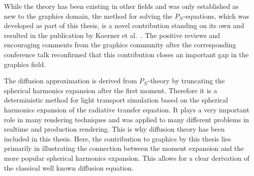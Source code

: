 While the theory has been existing in other fields and was only established as new to the graphics domain, the method for solving the $P_N$-equations, which was developed as part of this thesis, is a novel contribution standing on its own and resulted in the publication by Koerner et al.~\cite{Koerner18}. The positive reviews and encouraging comments from the graphics community after the corresponding conference talk reconfirmed that this contribution closes an important gap in the graphics field.

The diffusion approximation is derived from $P_N$-theory by truncating the spherical harmonics expansion after the first moment. Therefore it is a deterministic method for light transport simulation based on the spherical harmonics expansion of the radiative transfer equation. It plays a very important role in many rendering techniques and was applied to many different problems in realtime and production rendering. This is why diffusion theory has been included in this thesis. Here, the contribution to graphics by this thesis lies primarily in illustrating the connection between the moment expansion and the more popular spherical harmonics expansion. This allows for a clear derivation of the classical well known diffusion equation.

